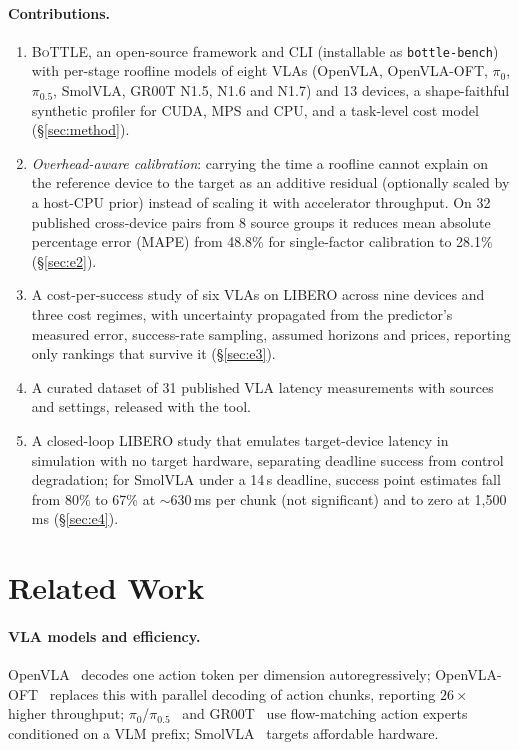 \documentclass[10pt]{article}
\newcommand{\bottle}{\textsc{BoTTLE}}
\begin{document}
\paragraph{Contributions.}
\begin{enumerate}
\item \bottle, an open-source framework and CLI (installable as \texttt{bottle-bench}) with
per-stage roofline models of eight VLAs (OpenVLA, OpenVLA-OFT, $\pi_0$, $\pi_{0.5}$, SmolVLA,
GR00T N1.5, N1.6 and N1.7) and 13 devices, a shape-faithful synthetic profiler for CUDA, MPS and CPU, and a
task-level cost model (\S\ref{sec:method}).
\item \emph{Overhead-aware calibration}: carrying the time a roofline cannot explain on the
reference device to the target as an additive residual (optionally scaled by a host-CPU prior)
instead of scaling it with accelerator throughput. On 32 published cross-device pairs from 8
source groups it reduces mean absolute percentage error (MAPE) from 48.8\% for single-factor
calibration to 28.1\% (\S\ref{sec:e2}).
\item A cost-per-success study of six VLAs on LIBERO across nine devices and three cost regimes,
with uncertainty propagated from the predictor's measured error, success-rate sampling, assumed
horizons and prices, reporting only rankings that survive it (\S\ref{sec:e3}).
\item A curated dataset of 31 published VLA latency measurements with sources and settings,
released with the tool.
\item A closed-loop LIBERO study that emulates target-device latency in simulation with no target
hardware, separating deadline success from control degradation; for SmolVLA under a 14\,s
deadline, success point estimates fall from 80\% to 67\% at ${\sim}630$\,ms per chunk (not
significant) and to zero at 1{,}500\,ms (\S\ref{sec:e4}).
\end{enumerate}

\section{Related Work}
\paragraph{VLA models and efficiency.} OpenVLA~\citep{kim2024openvla} decodes one action token per
dimension autoregressively; OpenVLA-OFT~\citep{kim2025oft} replaces this with parallel decoding of
action chunks, reporting $26\times$ higher throughput; $\pi_0$/$\pi_{0.5}$~\citep{black2024pi0,pi2025pi05}
and GR00T~\citep{nvidia2025gr00t} use flow-matching action experts conditioned on a VLM prefix;
SmolVLA~\citep{shukor2025smolvla} targets affordable hardware.
\end{document}
